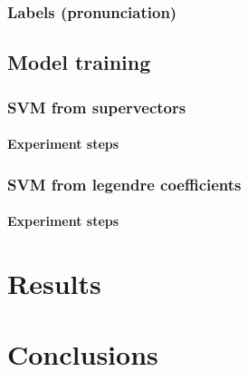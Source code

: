 \documentclass[11pt,a4paper]{tesis}
\begin{document}
		\subsection{Labels (pronunciation)}
			
	\section{Model training}
		\subsection{SVM from supervectors}
			\subsubsection{Experiment steps}
				
		\subsection{SVM from legendre coefficients}
			\subsubsection{Experiment steps}
				

\chapter{Results}
	
\chapter{Conclusions}

\printbibliography
 
\end{document}

